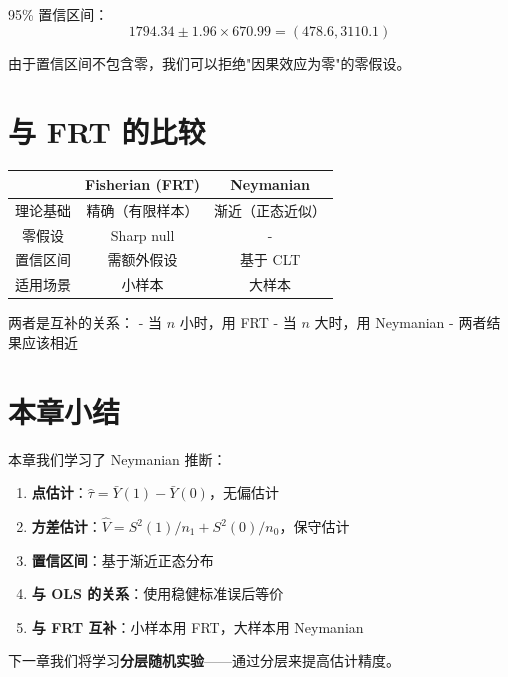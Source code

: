 95\% 置信区间：
\[
1794.34 \pm 1.96 \times 670.99 = (478.6, 3110.1)
\]

由于置信区间不包含零，我们可以拒绝"因果效应为零"的零假设。

\section{与 FRT 的比较}

\begin{center}
\begin{tabular}{c|c|c}
\hline
 & Fisherian (FRT) & Neymanian \\
\hline
理论基础 & 精确（有限样本） & 渐近（正态近似） \\
零假设 & Sharp null & - \\
置信区间 & 需额外假设 & 基于 CLT \\
适用场景 & 小样本 & 大样本 \\
\hline
\end{tabular}
\end{center}

两者是互补的关系：
- 当 $n$ 小时，用 FRT
- 当 $n$ 大时，用 Neymanian
- 两者结果应该相近

\section{本章小结}

本章我们学习了 Neymanian 推断：

\begin{enumerate}
  \item \textbf{点估计}：$\hat{\tau} = \bar{Y}(1) - \bar{Y}(0)$，无偏估计
  \item \textbf{方差估计}：$\hat{V} = S^2(1)/n_1 + S^2(0)/n_0$，保守估计
  \item \textbf{置信区间}：基于渐近正态分布
  \item \textbf{与 OLS 的关系}：使用稳健标准误后等价
  \item \textbf{与 FRT 互补}：小样本用 FRT，大样本用 Neymanian
\end{enumerate}

下一章我们将学习\textbf{分层随机实验}——通过分层来提高估计精度。

